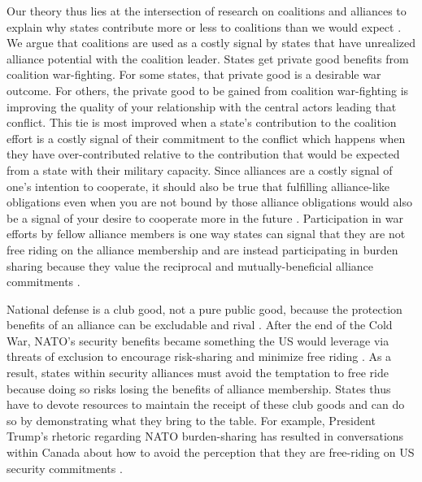 \documentclass[12pt,letterpaper]{article}
\begin{document}
	Our theory thus lies at the intersection of research on coalitions and alliances to explain why states contribute more or less to coalitions than we would expect \citep{saideman_ambivalentcoalitiondoing_2016}. We argue that coalitions are used as a costly signal by states that  have unrealized alliance potential with the coalition leader. States get private good benefits from coalition war-fighting. For some states, that private good is a desirable war outcome. For others, the private good to be gained from coalition war-fighting is improving the quality of your relationship with the central actors leading that conflict. This tie is most improved when a state's contribution to the coalition effort is a costly signal of their commitment to the conflict which happens when they have over-contributed relative to the contribution that would be expected from a state with their military capacity. Since alliances are a costly signal of one's intention to cooperate, it should also be true that fulfilling alliance-like obligations even when you are not bound by those alliance obligations would also be a signal of your desire to cooperate more in the future \citep[704]{warren_geometrysecuritymodeling_2010}. Participation in war efforts by fellow alliance members is one way states can signal that they are not free riding on the alliance membership and are instead participating in burden sharing because they value the reciprocal and mutually-beneficial alliance commitments \citep[225-227]{maskaliunaite_sharingburdenassessing_2014}.

	National defense is a club good, not a pure public good, because the protection benefits of an alliance can be excludable and rival \citep[336]{sandler_clubtheorythirty_1997}. After the end of the Cold War, NATO's security benefits became something the US would leverage via threats of exclusion to encourage risk-sharing and minimize free riding \citep[324-325]{ringsmose_natoburdensharingredux_2010}. As a result, states within security alliances must avoid the temptation to free ride because doing so risks losing the benefits of alliance membership. States thus have to devote resources to maintain the receipt of these club goods and can do so by demonstrating what they bring to the table. For example, President Trump's rhetoric regarding NATO burden-sharing has resulted in conversations within Canada about how to avoid the perception that they are free-riding on US security commitments \citep[143]{mckay_whycanadabest_2018}.
	
\end{document}
